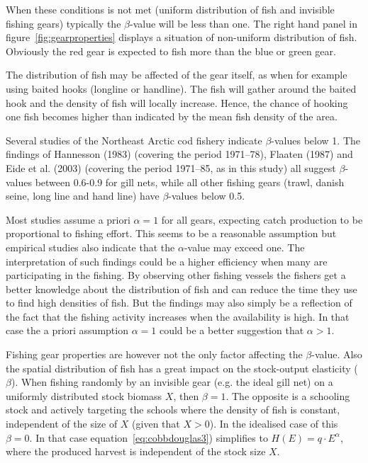 \documentclass[11pt,fleqn]{book} %
\begin{document}
When these conditions is not met (uniform distribution of fish and invisible fishing gears) typically the $\beta$-value will be less than one. The right hand panel in figure~\ref{fig:gearproperties} displays a situation of non-uniform distribution of fish. Obviously the red gear is expected to fish more than the blue or green gear. 

The distribution of fish may be affected of the gear itself, as when for example using baited hooks (longline or handline). The fish will gather around the baited hook and the density of fish will locally increase. Hence, the chance of hooking one fish becomes higher than indicated by the mean fish density of the area.

Several studies of the Northeast Arctic cod fishery indicate $\beta$-values below 1. The findings of Hannesson (1983)\cite{Hannesson1983} (covering the period 1971–78), Flaaten (1987)\cite{Flaaten1987} and Eide et al. (2003)\cite{Eide2003a} (covering the period 1971–85, as in this study) all suggest $\beta$-values between 0.6-0.9 for gill nets, while all other fishing gears (trawl, danish seine, long line and hand line) have $\beta$-values below 0.5.

Most studies assume a priori $\alpha = 1$ for all gears, expecting catch production to be proportional to fishing effort. This seems to be a reasonable assumption but empirical studies also indicate that the $\alpha$-value may exceed one\cite{Eide2003a}. The interpretation of such findings could be a higher efficiency when many are participating in the fishing. By observing other fishing vessels the fishers get a better knowledge about the distribution of fish and can reduce the time they use to find high densities of fish. But the findings may also simply be a reflection of the fact that the fishing activity increases when the availability is high. In that case the a priori assumption $\alpha = 1$ could be a better suggestion that $\alpha > 1$.

Fishing gear properties are however not the only factor affecting the $\beta$-value. Also the spatial distribution of fish has a great impact on the stock-output elasticity ($\beta$). When fishing randomly by an invisible gear (e.g. the ideal gill net) on a uniformly distributed stock biomass $X$, then $\beta = 1$. The opposite is a schooling stock and actively targeting the schools where the density of fish is constant, independent of the size of $X$ (given that $X > 0$). In the idealised case of this $\beta = 0$. In that case equation~\ref{eq:cobbdouglas3}) simplifies to $H(E) = q \cdot E^{\alpha}$, where the produced harvest is independent of the stock size $X$.
\end{document}
